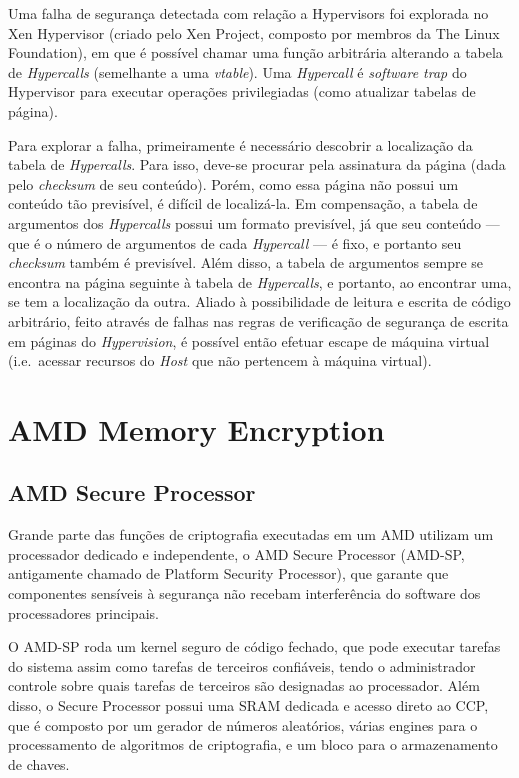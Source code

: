 \documentclass{report}
\begin{document}
Uma falha de segurança detectada com relação a Hypervisors foi explorada no Xen
Hypervisor (criado pelo Xen Project, composto por membros da The Linux
Foundation), em que é possível chamar uma função arbitrária alterando a tabela
de \textit{Hypercalls} (semelhante a uma \textit{vtable}). Uma
\textit{Hypercall} é \textit{software trap} do Hypervisor para executar
operações privilegiadas (como atualizar tabelas de página).

Para explorar a falha, primeiramente é necessário descobrir a localização da
tabela de \textit{Hypercalls}. Para isso, deve-se procurar pela assinatura da
página (dada pelo \textit{checksum} de seu conteúdo). Porém, como essa página
não possui um conteúdo tão previsível, é difícil de localizá-la. Em
compensação, a tabela de argumentos dos \textit{Hypercalls} possui um formato
previsível, já que seu conteúdo --- que é o número de argumentos de cada
\textit{Hypercall} --- é fixo, e portanto seu \textit{checksum} também é
previsível. Além disso, a tabela de argumentos sempre se encontra na página
seguinte à tabela de \textit{Hypercalls}, e portanto, ao encontrar uma, se tem
a localização da outra. Aliado à possibilidade de leitura e escrita de código
arbitrário, feito através de falhas nas regras de verificação de segurança de
escrita em páginas do \textit{Hypervision}, é possível então efetuar escape de
máquina virtual (i.e.\ acessar recursos do \textit{Host} que não pertencem à
máquina virtual).

\chapter{AMD Memory Encryption}

\section{AMD Secure Processor}

Grande parte das funções de criptografia executadas em um AMD utilizam um
processador dedicado e independente, o AMD Secure Processor (AMD-SP,
antigamente chamado de Platform Security Processor), que garante que
componentes sensíveis à segurança não recebam interferência do software dos
processadores principais.

O AMD-SP roda um kernel seguro de código fechado, que pode executar tarefas do
sistema assim como tarefas de terceiros confiáveis, tendo o administrador
controle sobre quais tarefas de terceiros são designadas ao processador. Além
disso, o Secure Processor possui uma SRAM dedicada e acesso direto ao CCP, que
é composto por um gerador de números aleatórios, várias engines para o
processamento de algoritmos de criptografia, e um bloco para o armazenamento de
chaves.
\end{document}
